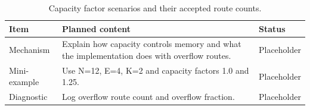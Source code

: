 \begin{table}[H]
\centering
\caption{Capacity factor scenarios and their accepted route counts.}
\label{tab:ch06-capacity-factors-and-overflow-policy}
\begin{tabularx}{\textwidth}{p{}X p{}}
\toprule
Item & Planned content & Status \\
\midrule
Mechanism & Explain how capacity controls memory and what the implementation does with overflow routes. & Placeholder \\
Mini-example & Use N=12, E=4, K=2 and capacity factors 1.0 and 1.25. & Placeholder \\
Diagnostic & Log overflow route count and overflow fraction. & Placeholder \\
\bottomrule
\end{tabularx}
\end{table}
